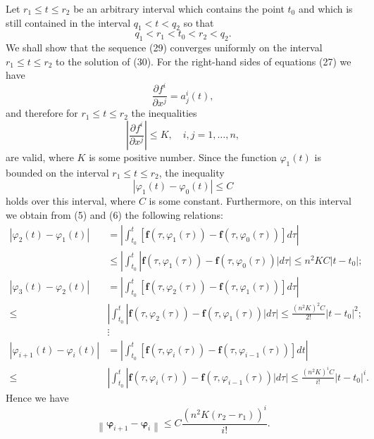 \documentclass[10pt,a5paper]{book}
\makeatletter
\theoremstyle{plain}
\theoremstyle{definition}
\theoremstyle{remark}
\renewenvironment{proof}[1][\proofname]{\par
  \pushQED{\qed}%
  \normalfont\topsep6\p@\@plus6\p@\relax
  \trivlist
  \item\relax{\itshape #1\@addpunct{.}}\hspace\labelsep\ignorespaces
}{\popQED\endtrivlist\@endpefalse}
\makeatother
\begin{document}
\begin{proof}[Proof of Theorem 3]
Let $r_{1} \leq t \leq r_{2}$ be an arbitrary interval which contains the point $t_{0}$ and which is still contained in the interval $q_{1}<t<q_{2}$ so that
\[
q_{1}<r_{1}<t_{0}<r_{2}<q_{2} .
\]
We shall show that the sequence (29) converges uniformly on the interval $r_{1} \leq t \leq r_{2}$ to the solution of (30). For the right-hand sides of equations (27) we have
\[
\frac{\partial f^{i}}{\partial x^{j}}=a_{j}^{i}(t),
\]
and therefore for $r_{1} \leq t \leq r_{2}$ the inequalities
\[
\left|\frac{\partial f^{i}}{\partial x^{j}}\right| \leq K, \quad i, j=1, \ldots, n,
\]
are valid, where $K$ is some positive number. Since the function $\varphi_{1}(t)$ is bounded on the interval $r_{1} \leq t \leq r_{2}$, the inequality
\[
\left|\varphi_{1}(t)-\varphi_{0}(t)\right| \leq C
\]
holds over this interval, where $C$ is some constant. Furthermore, on this
interval we obtain from (5) and (6) the following relations:
\[
\begin{aligned}
\left|\varphi_{2}(t)-\varphi_{1}(t)\right| & =\left|\int_{t_{0}}^{t}\left[\mathbf{f}\left(\tau, \varphi_{1}(\tau)\right)-\mathbf{f}\left(\tau, \varphi_{0}(\tau)\right)\right] d \tau\right| \\
& \leq\left|\int_{t_{0}}^{t}\right| \mathbf{f}\left(\tau, \varphi_{1}(\tau)\right)-\mathbf{f}\left(\tau, \varphi_{0}(\tau)\right)|d \tau| \leq n^{2} K C\left|t-t_{0}\right| ; \\
\left|\varphi_{3}(t)-\varphi_{2}(t)\right| & =\left|\int_{t_{0}}^{t}\left[\mathbf{f}\left(\tau, \varphi_{2}(\tau)\right)-\mathbf{f}\left(\tau, \varphi_{1}(\tau)\right)\right] d \tau\right| \\
\leq & \left|\int_{t_{0}}^{t}\right| \mathbf{f}\left(\tau, \varphi_{2}(\tau)\right)-\mathbf{f}\left(\tau, \varphi_{1}(\tau)\right)|d \tau| \leq \frac{\left(n^{2} K\right)^{2} C}{2!}\left|t-t_{0}\right|^{2} ; \\
& \vdots \\
\left|\varphi_{i+1}(t)-\varphi_{i}(t)\right| & =\left|\int_{t_{0}}^{t}\left[\mathbf{f}\left(\tau, \varphi_{i}(\tau)\right)-\mathbf{f}\left(\tau, \varphi_{i-1}(\tau)\right)\right] d t\right| \\
\leq & \left|\int_{t_{0}}^{t}\right| \mathbf{f}\left(\tau, \varphi_{i}(\tau)\right)-\mathbf{f}\left(\tau, \varphi_{i-1}(\tau)\right)|d \tau| \leq \frac{\left(n^{2} K\right)^{i} C}{i!}\left|t-t_{0}\right|^{i} .
\end{aligned}
\]
Hence we have
\[
\left\|\boldsymbol{\varphi}_{i+1}-\boldsymbol{\varphi}_{i}\right\| \leq C \frac{\left(n^{2} K\left(r_{2}-r_{1}\right)\right)^{i}}{i!} .
\]
\end{proof}
\end{document}
